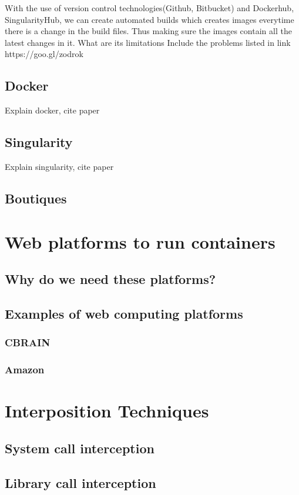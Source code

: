 With the use of version control technologies(Github, Bitbucket) and Dockerhub, SingularityHub, we can create automated builds which creates images everytime there is a change in the build files. Thus making sure the images contain all the latest changes in it. 
What are its limitations
Include the problems listed in link https://goo.gl/zodrok
\subsection{Docker}
Explain docker, cite paper
\subsection{Singularity}
Explain singularity, cite paper
\subsection{Boutiques}

\section{Web platforms to run containers}
\subsection{Why do we need these platforms?}
\subsection{Examples of web computing platforms}
\subsubsection{CBRAIN}
\subsubsection{Amazon}

\section{Interposition Techniques}
\subsection{System call interception}
\subsection{Library call interception}
